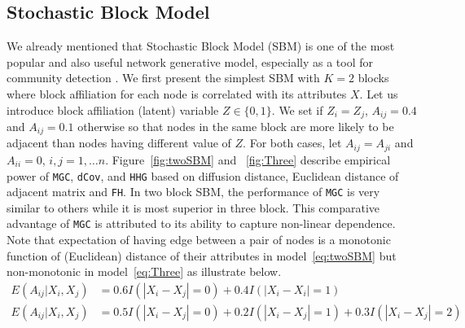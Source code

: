 \documentclass[12pt]{article}
\theoremstyle{definition}
\begin{document}
\subsection{Stochastic Block Model}

We already mentioned that Stochastic Block Model (SBM) is one of the most popular and also useful network generative model, especially as a tool for community detection \citep{karrer2011stochastic}. We first present the simplest SBM with $K = 2$ blocks where block affiliation for each node is correlated with its attributes $X$. Let us introduce block affiliation (latent) variable $Z \in \{ 0, 1 \}$. We set if $Z_{i}  = Z_{j}$, $A_{ij} = 0.4$ and $A_{ij} = 0.1$  otherwise so that nodes in the same block are more likely to be adjacent than nodes having different value of $Z$. 
For both cases, let $A_{ij} = A_{ji}$ and $A_{ii} = 0$, $i,j=1, \ldots n$. Figure~\ref{fig:twoSBM} and ~\ref{fig:Three} describe empirical power of \texttt{MGC}, \texttt{dCov}, and \texttt{HHG} based on diffusion distance, Euclidean distance of adjacent matrix and \texttt{FH}. In two block SBM, the performance of \texttt{MGC} is very similar to others while it is most superior in three block. This comparative advantage of \texttt{MGC} is attributed to its ability to capture non-linear dependence. Note that expectation of having edge between a pair of nodes is a monotonic function of (Euclidean) distance of their attributes in model~\ref{eq:twoSBM} but non-monotonic in model~\ref{eq:Three} as illustrate below. 
\begin{equation}
\begin{aligned}
E(A_{ij} | X_{i}, X_{j}) &  =  0.6 I(|X_{i} - X_{j}| = 0) + 0.4 I(|X_{i} - X_{i}| = 1)  \\
E(A_{ij} | X_{i}, X_{j}) & = 0.5 I(|X_{i} - X_{j}| = 0) + 0.2 I(|X_{i} - X_{j}| = 1) + 0.3 I(|X_{i} - X_{j}| = 2)
\end{aligned}
\end{equation}
\end{document}
